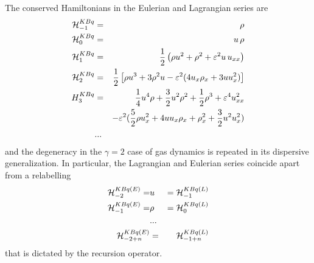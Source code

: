 \documentclass[a4paper,12pt]{article}
\begin{document}
The conserved Hamiltonians in the Eulerian and Lagrangian series
are
\begin{eqnarray}
{\cal H}_{-1}^{KBq} & = &  \rho \label{hkb1} \\
{\cal H}_0^{KBq} & = & u \, \rho  \label{hkb2} \\
 {\cal H}_{1}^{KBq} &=& \frac{1}{2} \left( \rho u^{2}+\rho
^{2} + \varepsilon ^{2} u \, u_{xx} \right) \label{hkb3}  \\ {\cal
H}_{2}^{KBq} &=&\frac{1}{2}\left[ \rho u^{3}+3\rho
^{2}u-\varepsilon ^{2}(4u_{x}\rho _{x}+3uu_{x}^{2} ) \right]
\label{hkb5} \\ H_{3}^{KBq}&=&\frac{1}{4}u^{4}\rho
+\frac{3}{2}u^{2}\rho ^{2}+\frac{1}{2}\rho ^{3}+\varepsilon
^{4}u_{xx}^{2} \label{hkb6} \\ && -\varepsilon
^{2}(\frac{5}{2}\rho u_{x}^{2}+4uu_{x}\rho _{x}+\rho
_{x}^{2}+\frac{3}{2}u^{2}u_{x}^{2})  \nonumber
 \\ & ... &   \nonumber
\end{eqnarray}
and the degeneracy in the $\gamma = 2$ case of gas dynamics is
repeated in its dispersive generalization. In particular, the
Lagrangian and Eulerian series coincide apart from a relabelling
\begin{eqnarray}
{\cal H}_{-2}^{KBq(E)} = & u & = {\cal H}_{-1}^{KBq(L)} \nonumber
\\ {\cal H}_{-1}^{KBq(E)} = & \rho & = {\cal H}_{0}^{KBq(L)} \label{degen}
\\ & ... & \nonumber \\ {\cal H}_{-2+n}^{KBq(E)}  & =&  {\cal H}_{-1+n}^{KBq(L)}
\nonumber
\end{eqnarray}
that is dictated by the recursion operator.
\end{document}
